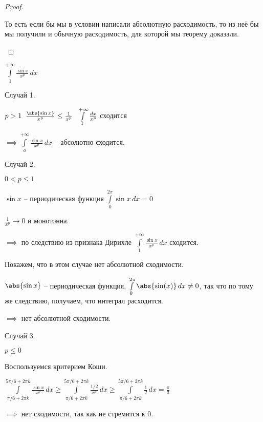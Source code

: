\begin{proof}
\begin{enumerate}
    То есть если бы мы в условии написали абсолютную расходимость, то из неё бы мы получили и обычную расходимость, для которой мы теорему доказали.

    \end{enumerate}
	
\end{proof}

\begin{example}\slashns
	
	$\int\limits_1^{+\infty} \frac{\sin x}{x^p} \, dx$
	
	Случай 1.
	
	$p  > 1 \;\; \frac{\abs{\sin x}}{x^p} \le \frac{1}{x^p} \;\; \int\limits_1^{+\infty} \frac{dx}{x^p}$ сходится
	
	$\implies \int\limits_a^{+\infty} \frac{\sin x}{x^p}\, dx$ -- абсолютно сходится.
	
	Случай 2.
	
	$0 < p \le 1$
	
	$\sin x$ -- периодическая функция $\int\limits_0^{2\pi} \sin x\, dx = 0$
	
	$\frac{1}{x^p} \to 0$ и монотонна. 
	
    $\implies $ по следствию из признака Дирихле $\int\limits_1^{+\infty} \frac{\sin x}{x^p} \, dx$ сходится.
	
	Покажем, что в этом случае нет абсолютной сходимости.
	
	$\abs{\sin x}$ -- периодическая функция, $\int\limits_0^{2\pi} \abs{\sin(x)}\, dx \ne 0$, так что по тому же следствию, получаем, что интеграл расходится.
	
	$\implies$ нет абсолютной сходимости.
	
	Случай 3.
	
	$p \le 0$
	
    Воспользуемся критерием Коши.
	
	$\int\limits_{\pi/6+2\pi k}^{5\pi/6 + 2\pi k} \frac{\sin x}{x^p} \,dx \ge \int\limits_{\pi/6+2\pi k}^{5\pi/6 + 2\pi k} \frac{1/2}{x^p} \,dx \ge \int\limits_{\pi/6+2\pi k}^{5\pi/6 + 2\pi k} \frac{1}{2} \,dx = \frac{\pi}{3}$
	
	$\implies$ нет сходимости, так как не стремится к 0.
\end{example}


